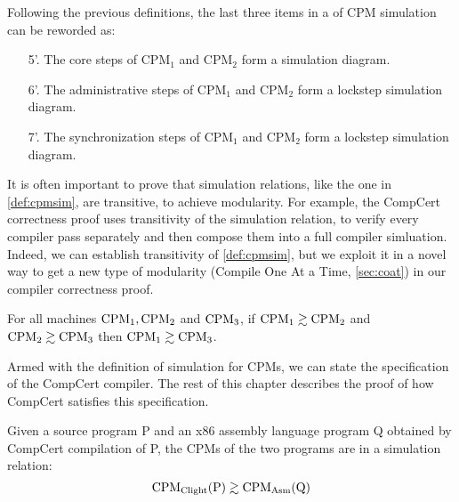 Following the previous definitions, the last three items in a of CPM simulation can be reworded as:
\begin{enumerate}
\item[5'.] The core steps of $\text{CPM}_1$ and $\text{CPM}_2$ form a simulation diagram. 
\item[6'.] The administrative steps of $\text{CPM}_1$ and $\text{CPM}_2$ form a lockstep simulation diagram.
\item[7'.] The synchronization steps of $\text{CPM}_1$ and $\text{CPM}_2$ form a lockstep simulation diagram.
\end{enumerate}

It is often important to prove that simulation relations, like the one in \cref{def:cpmsim}, are transitive, to achieve modularity. For example, the CompCert correctness proof uses transitivity of the simulation relation, to verify every compiler pass separately and then compose them into a full compiler simluation. Indeed, we can establish transitivity of \cref{def:cpmsim}, but we exploit it in a novel way to get  a new type of modularity (Compile One At a Time, \autoref{sec:coat}) in our compiler correctness proof. 

\begin{lemma}\label{thm:simcompose}
For all machines $\text{CPM}_1, \text{CPM}_2$ and $\text{CPM}_3$, if $\text{CPM}_1 \gtrsim \text{CPM}_2$ and $\text{CPM}_2 \gtrsim \text{CPM}_3$  then $\text{CPM}_1 \gtrsim \text{CPM}_3$.
\end{lemma}
 

Armed with the definition of simulation for CPMs, we can state the specification of the CompCert compiler. The rest of this chapter describes the proof of how CompCert satisfies this specification. 

\begin{theorem}\label{thm:compspec}
Given a source program P and an x86 assembly language program Q obtained by CompCert compilation of P, the CPMs of the two programs are in a simulation relation:
$$\text{CPM}_{\text{Clight}}(\text{P}) \gtrsim \text{CPM}_{\text{Asm}}(\text{Q})$$
\end{theorem}